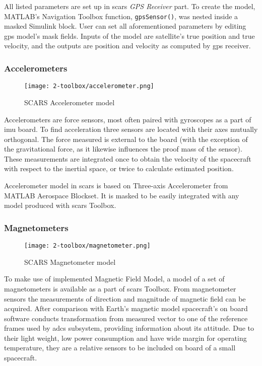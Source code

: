        All listed parameters are set up in \ac{scars} \textit{GPS Receiver} part. To create the model, MATLAB's Navigation Toolbox function, \verb|gpsSensor()|, was nested inside a masked Simulink block. User can set all aforementioned parameters by editing \ac{gps} model's mask fields. Inputs of the model are satellite's true position and true velocity, and the outputs are position and velocity as computed by \ac{gps} receiver.


    \subsubsection{Accelerometers}
        \begin{figure}[h]
            \centering
            \texttt{[image: 2-toolbox/accelerometer.png]}
            \caption{SCARS Accelerometer model}
            \label{fig:accelerometer}
        \end{figure}
        Accelerometers are force sensors, most often paired with gyroscopes as a part of \ac{imu} board. To find acceleration three sensors are located with their axes mutually orthogonal. The force measured is external to the board (with the exception of the gravitational force, as it likewise influences the proof mass of the sensor). These measurements are integrated once to obtain the velocity of the spacecraft with respect to the inertial space, or twice to calculate estimated position.

        Accelerometer model in \ac{scars} is based on Three-axis Accelerometer from MATLAB Aerospace Blockset. It is masked to be easily integrated with any model produced with \ac{scars} Toolbox.



    \subsubsection{Magnetometers}
        \begin{figure}[h]
            \centering
            \texttt{[image: 2-toolbox/magnetometer.png]}
            \caption{SCARS Magnetometer model}
            \label{fig:magnetometer}
        \end{figure}

        To make use of implemented Magnetic Field Model, a model of a set of magnetometers is available as a part of \ac{scars} Toolbox. From magnetometer sensors the measurements of direction and magnitude of magnetic field can be acquired. After comparison with Earth's magnetic model spacecraft's on board software conducts transformation from measured vector to one of the reference frames used by \ac{adcs} subsystem, providing information about its attitude. Due to their light weight, low power consumption and have wide margin for operating temperature, they are a relative sensors to be included on board of a small spacecraft.

